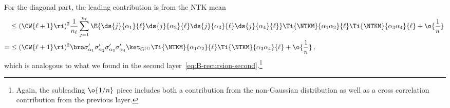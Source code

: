 For the diagonal part, the leading contribution is from the NTK mean 
\begin{align}\label{eq:NTHvariance_piece1}
&\le(\CW{\ell+1}\ri)^2\frac{1}{n_{\ell}}\sum_{j=1}^{n_{\ell}}\E{\ds{j}{\alpha_1}{\ell} \ds{j}{\alpha_2}{\ell} \ds{j}{\alpha_3}{\ell} \ds{j}{\alpha_4}{\ell} }\Ti{\NTKM}{\alpha_1\alpha_2}{\ell}\Ti{\NTKM}{\alpha_3\alpha_4}{\ell} +\o{\frac{1}{n}}\, \\
=&\le(\CW{\ell+1}\ri)^2\bra\sigma^{\prime}_{\alpha_1} \sigma^{\prime}_{\alpha_2}\sigma^{\prime}_{\alpha_3} \sigma^{\prime}_{\alpha_4}  \ket_{G^{(\ell)}}\Ti{\NTKM}{\alpha_1\alpha_2}{\ell}\Ti{\NTKM}{\alpha_3\alpha_4}{\ell} +\o{\frac{1}{n}}\, ,\nonumber
\end{align}
which is analogous to what we found in the second layer~\eqref{eq:B-recursion-second}.\footnote{Again, the subleading $\o{1/n}$ piece includes both a contribution from the non-Gaussian distribution as well as a cross correlation contribution from the previous layer.
}



